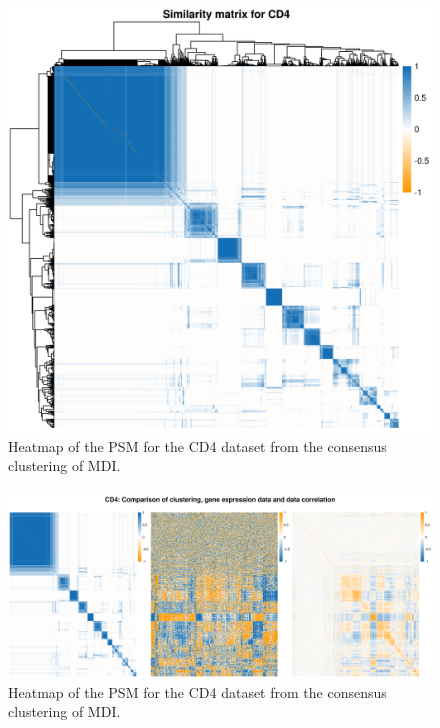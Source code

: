 \documentclass[12pt]{article} %
\begin{document}
	
	
	
	\begin{figure}[h]
		\centering
		\includegraphics[scale=0.75]{Images/Biology_data/Set_1000/All_datasets/Similarity_matrices/similarity_matrix_CD4.png}
		\caption{Heatmap of the PSM for the CD4 dataset from the consensus clustering of MDI.}
		\label{fig:results:cedar_2:mdi_cd4_psm}
	\end{figure}
	
	
	\begin{figure}
		\centering
		\includegraphics[scale=0.5]{Images/Biology_data/Set_1000/All_datasets/Comparison_expression_clustering_correlation/CD4.png}
		\caption{Heatmap of the PSM for the CD4 dataset from the consensus clustering of MDI.}
		\label{fig:results:cedar_2:mdi_cd4_psm_expr_cor}
	\end{figure}
	
\end{document}
